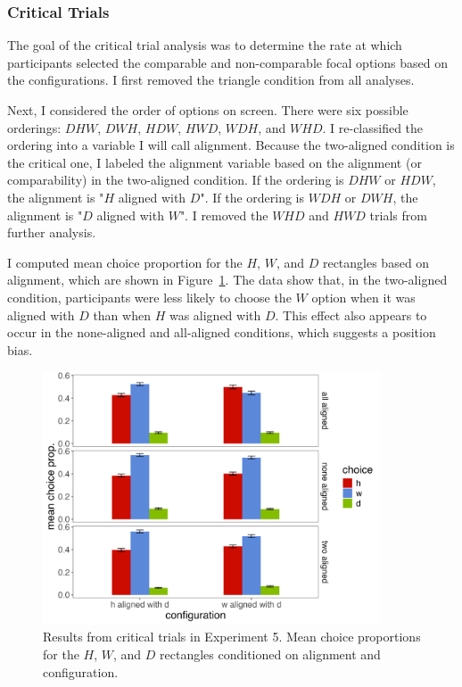 \subsubsection{Critical Trials}

The goal of the critical trial analysis was to determine the rate at which participants selected the comparable and non-comparable focal options based on the configurations. I first removed the triangle condition from all analyses.

Next, I considered the order of options on screen. There were six possible orderings: $DHW$, $DWH$, $HDW$, $HWD$, $WDH$, and $WHD$. I re-classified the ordering into a variable I will call alignment. Because the two-aligned condition is the critical one, I labeled the alignment variable based on the alignment (or comparability) in the two-aligned condition. If the ordering is $DHW$ or $HDW$, the alignment is "$H$ aligned with $D$". If the ordering is $WDH$ or $DWH$, the alignment is "$D$ aligned with $W$". I removed the $WHD$ and $HWD$ trials from further analysis.

I computed mean choice proportion for the $H$, $W$, and $D$ rectangles based on alignment, which are shown in Figure~\ref{fig:comparability_crit_mean_choices}. The data show that, in the two-aligned condition, participants were less likely to choose the $W$ option when it was aligned with $D$ than when $H$ was aligned with $D$. This effect also appears to occur in the none-aligned and all-aligned conditions, which suggests a position bias. 

\begin{figure}
   \includegraphics[width=100mm]{figures/comparability_crit_mean_hdw_choice_by_config_align.jpeg}
   \caption{Results from critical trials in Experiment 5. Mean choice proportions for the $H$, $W$, and $D$ rectangles conditioned on alignment and configuration.}
   \label{fig:comparability_crit_mean_choices}
\end{figure}


